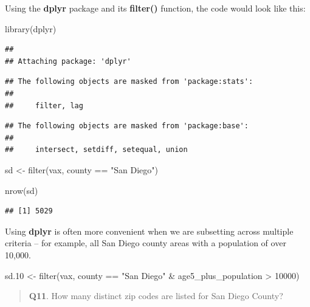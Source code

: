 \documentclass[
]{article}
\newenvironment{Shaded}{\begin{snugshade}}{\end{snugshade}}
\newcommand{\DecValTok}[1]{\textcolor[rgb]{0.00,0.00,0.81}{#1}}
\newcommand{\FloatTok}[1]{\textcolor[rgb]{0.00,0.00,0.81}{#1}}
\newcommand{\FunctionTok}[1]{\textcolor[rgb]{0.00,0.00,0.00}{#1}}
\newcommand{\NormalTok}[1]{#1}
\newcommand{\OtherTok}[1]{\textcolor[rgb]{0.56,0.35,0.01}{#1}}
\newcommand{\SpecialCharTok}[1]{\textcolor[rgb]{0.00,0.00,0.00}{#1}}
\newcommand{\StringTok}[1]{\textcolor[rgb]{0.31,0.60,0.02}{#1}}
\begin{document}
Using the \textbf{dplyr} package and its \textbf{filter()} function, the
code would look like this:

\begin{Shaded}
\begin{Highlighting}[]
\FunctionTok{library}\NormalTok{(dplyr)}
\end{Highlighting}
\end{Shaded}

\begin{verbatim}
## 
## Attaching package: 'dplyr'
\end{verbatim}

\begin{verbatim}
## The following objects are masked from 'package:stats':
## 
##     filter, lag
\end{verbatim}

\begin{verbatim}
## The following objects are masked from 'package:base':
## 
##     intersect, setdiff, setequal, union
\end{verbatim}

\begin{Shaded}
\begin{Highlighting}[]
\NormalTok{sd }\OtherTok{\textless{}{-}} \FunctionTok{filter}\NormalTok{(vax, county }\SpecialCharTok{==} \StringTok{"San Diego"}\NormalTok{)}

\FunctionTok{nrow}\NormalTok{(sd)}
\end{Highlighting}
\end{Shaded}

\begin{verbatim}
## [1] 5029
\end{verbatim}

Using \textbf{dplyr} is often more convenient when we are subsetting
across multiple criteria -- for example, all San Diego county areas with
a population of over 10,000.

\begin{Shaded}
\begin{Highlighting}[]
\NormalTok{sd}\FloatTok{.10} \OtherTok{\textless{}{-}} \FunctionTok{filter}\NormalTok{(vax, county }\SpecialCharTok{==} \StringTok{"San Diego"} \SpecialCharTok{\&}
\NormalTok{                  age5\_plus\_population }\SpecialCharTok{\textgreater{}} \DecValTok{10000}\NormalTok{)}
\end{Highlighting}
\end{Shaded}

\begin{quote}
\textbf{Q11}. How many distinct zip codes are listed for San Diego
County?
\end{quote}
\end{document}
